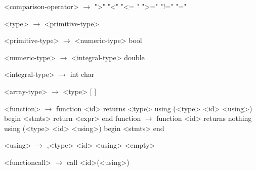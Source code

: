 \documentclass{article}
\begin{document}
\begin{grammar}
<comparison-operator> $\rightarrow$ ">"
				\alt "<"
				\alt "<= "
				\alt ">="
				\alt "!="
				\alt "="

<type> $\rightarrow$ <primitive-type>

<primitive-type> $\rightarrow$ <numeric-type>
\alt bool

<numeric-type> $\rightarrow$ <integral-type>
\alt double

<integral-type> $\rightarrow$ int
\alt char

<array-type> $\rightarrow$ <type> [ ]

<function> $\rightarrow$  function <id> returns <type> using (<type> <id> <using>)
begin
	<stmts>
	return <expr>
end
\alt function $\rightarrow$ function <id> returns nothing using (<type> <id> <using>)
begin
	<stmts>
end

<using> $\rightarrow$ ,<type> <id> <using>
\alt <empty>

<functioncall> $\rightarrow$ call <id>(<using>)

\end{grammar}
\end{document}
